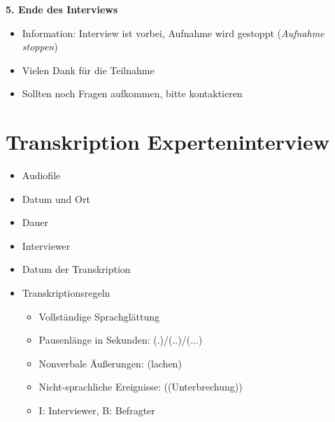 \noindent
\textbf{5. Ende des Interviews}
\begin{itemize}
  \item Information: Interview ist vorbei, Aufnahme wird gestoppt (\textit{Aufnahme stoppen})
  \item Vielen Dank für die Teilnahme
  \item Sollten noch Fragen aufkommen, bitte kontaktieren
\end{itemize}

\newpage
\section{Transkription Experteninterview}
\begin{itemize}
  \item Audiofile
  \item Datum und Ort
  \item Dauer
  \item Interviewer
  \item Datum der Transkription
  \item Transkriptionsregeln
  \begin{itemize}
    \item Vollständige Sprachglättung
    \item Pausenlänge in Sekunden: (.)/(..)/(...)
    \item Nonverbale Äußerungen: (lachen)
    \item Nicht-sprachliche Ereignisse: ((Unterbrechung))
    \item I: Interviewer, B: Befragter
  \end{itemize}
\end{itemize}

\newpage
